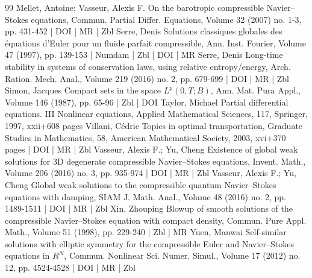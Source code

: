 \begin{thebibliography}{99}
Mellet, Antoine; Vasseur, Alexis F. On the barotropic compressible Navier–Stokes equations, Commun. Partial Differ. Equations, Volume 32 (2007) no. 1-3, pp. 431-452 | DOI | MR | Zbl
Serre, Denis Solutions classiques globales des équations d’Euler pour un fluide parfait compressible, Ann. Inst. Fourier, Volume 47 (1997), pp. 139-153 | Numdam | Zbl | DOI | MR
Serre, Denis Long-time stability in systems of conservation laws, using relative entropy/energy, Arch. Ration. Mech. Anal., Volume 219 (2016) no. 2, pp. 679-699 | DOI | MR | Zbl
Simon, Jacques Compact sets in the space ${L}^ p(0,{T};{B})$, Ann. Mat. Pura Appl., Volume 146 (1987), pp. 65-96 | Zbl | DOI
Taylor, Michael Partial differential equations. III Nonlinear equations, Applied Mathematical Sciences, 117, Springer, 1997, xxii+608 pages
Villani, Cédric Topics in optimal transportation, Graduate Studies in Mathematics, 58, American Mathematical Society, 2003, xvi+370 pages | DOI | MR | Zbl
Vasseur, Alexis F.; Yu, Cheng Existence of global weak solutions for 3D degenerate compressible Navier–Stokes equations, Invent. Math., Volume 206 (2016) no. 3, pp. 935-974 | DOI | MR | Zbl
Vasseur, Alexis F.; Yu, Cheng Global weak solutions to the compressible quantum Navier–Stokes equations with damping, SIAM J. Math. Anal., Volume 48 (2016) no. 2, pp. 1489-1511 | DOI | MR | Zbl
Xin, Zhouping Blowup of smooth solutions of the compressible Navier–Stokes equation with compact density, Commun. Pure Appl. Math., Volume 51 (1998), pp. 229-240 | Zbl | MR
Yuen, Manwai Self-similar solutions with elliptic symmetry for the compressible Euler and Navier–Stokes equations in ${R}^{N}$, Commun. Nonlinear Sci. Numer. Simul., Volume 17 (2012) no. 12, pp. 4524-4528 | DOI | MR | Zbl
\end{thebibliography}
